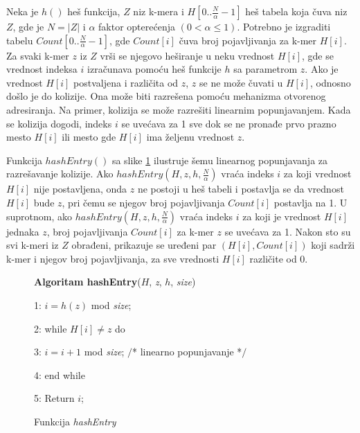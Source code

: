 \documentclass[12pt,oneside]{memoir}
\begin{document}
Neka je $h()$ heš funkcija, $Z$ niz k-mera i $H[0..\frac{N}{\alpha} - 1]$ heš tabela koja čuva niz $Z$, gde je $N = |Z|$ i $\alpha$ faktor opterećenja $(0 < \alpha \leq 1)$. Potrebno je izgraditi tabelu $Count[0..\frac{N}{\alpha} - 1]$, gde $Count[i]$ čuva broj pojavljivanja za k-mer $H[i]$. Za svaki k-mer $z$ iz $Z$ vrši se njegovo heširanje u neku vrednost $H[i]$, gde se vrednost indeksa $i$ izračunava pomoću heš funkcije $h$ sa parametrom $z$. Ako je vrednost $H[i]$ postvaljena i različita od $z$, $z$ se ne može čuvati u $H[i]$, odnosno došlo je do kolizije. Ona može biti razrešena pomoću mehanizma otvorenog adresiranja. Na primer, kolizija se može razrešiti linearnim popunjavanjem. Kada se kolizija dogodi, indeks $i$ se uvećava za 1 sve dok se ne pronađe prvo prazno mesto $H[i]$ ili mesto gde $H[i]$ ima željenu vrednost $z$.

\begin{comment}

\begin{figure}[!ht]
  \centering
  \texttt{[image: HashEntry.PNG]}
  \caption{Funkcija hashEntry \cite{WingKinSung}}
  \label{fig:hashEntry}
\end{figure}

\end{comment}

Funkcija $hashEntry()$ sa slike \ref{box:hashEntry} ilustruje šemu linearnog popunjavanja za razrešavanje kolizije. Ako $hashEntry(H, z, h, \frac{N}{\alpha})$ vraća indeks $i$ za koji vrednost $H[i]$ nije postavljena, onda $z$ ne postoji u heš tabeli i postavlja se da vrednost $H[i]$ bude $z$, pri čemu se njegov broj pojavljivanja $Count[i]$ postavlja na 1. U suprotnom, ako $hashEntry(H, z, h, \frac{N}{\alpha})$ vraća indeks $i$ za koji je vrednost $H[i]$ jednaka $z$, broj pojavljivanja $Count[i]$ za k-mer $z$ se uvećava za 1. Nakon sto su svi k-meri iz $Z$ obrađeni, prikazuje se uređeni par $(H[i], Count[i])$ koji sadrži k-mer i njegov broj pojavljivanja, za sve vrednosti $H[i]$ različite od 0.

\begin{figure}[!ht]
\begin{tcolorbox}
\textbf{Algoritam hashEntry}($H$, \textit{z}, $h$, \textit{size})

1: $i = h(z)$ mod \textit{size};

2: while $H[i] \neq z$ do

3:\hspace{1cm} $i = i + 1$ mod \textit{size}; $/$* linearno popunjavanje *$/$

4: end while

5: Return $i$;
\end{tcolorbox}
\caption{Funkcija \textit{hashEntry} \cite{WingKinSung}}
\label{box:hashEntry}
\end{figure}
\end{document}
